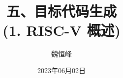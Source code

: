 \documentclass[]{beamer}
\title[目标代码生成]{五、目标代码生成 \\ (1. RISC-V 概述)}
\author[魏恒峰]{\large 魏恒峰}
\institute{hfwei@nju.edu.cn}
\date{2023年06月02日}
\begin{document}
\maketitle



\thankyou{}

\end{document}
